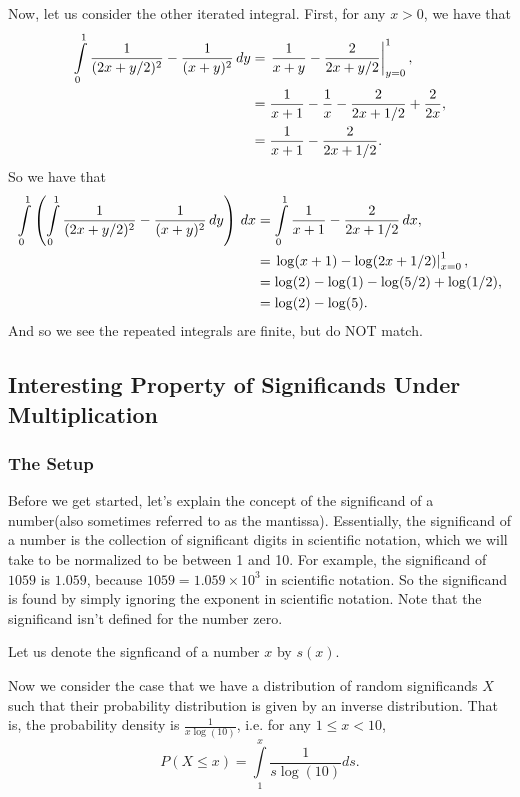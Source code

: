 Now, let us consider the other iterated integral. First, for any \(x > 0\), we have that
\begin{align}
\int\limits_0^1 \frac{1}{(2x + y/2)^2} - \frac{1}{(x+y)^2} \, dy & = \left.\frac{1}{x+y} - \frac{2}{2x + y/2}\right|_{y = 0}^1, \\
    & = \frac{1}{x+1} - \frac{1}{x} -\frac{2}{2x+1/2} + \frac{2}{2x}, \\ 
    & = \frac{1}{x+1} - \frac{2}{2x+1/2}.
\end{align}
So we have that
\begin{align}
\int\limits_0^1 \left(\int\limits_0^1 \frac{1}{(2x + y/2)^2} - \frac{1}{(x+y)^2} \, dy\right) \, dx & = \int\limits_0^1 \frac{1}{x+1} - \frac{2}{2x+1/2} \, dx, \\
    & = \left. \log(x+1) - \log(2x + 1/2)\right|_{x = 0}^1, \\
    & = \log(2) - \log(1) - \log(5/2) + \log(1/2), \\
    & = \log(2) - \log(5). 
\end{align}
And so we see the repeated integrals are finite, but do NOT match.



\subsection{Interesting Property of Significands Under Multiplication}

\subsubsection*{The Setup}

Before we get started, let's explain the concept of the significand of a number(also sometimes referred to as the mantissa). Essentially, the significand of a
number is the collection of significant digits in scientific notation, which we will take to be normalized to be between 1 and 10. For example, the
significand of \(1059\) is \(1.059\), because \(1059 = 1.059 \times 10^3\) in scientific notation. So the significand is found by simply ignoring the exponent
in scientific notation. Note that the significand isn't defined for the number zero. 

Let us denote the signficand of a number \(x\) by \(s(x)\).

Now we consider the case that we have a distribution of random significands \(X\) such that their probability distribution is given by 
an inverse distribution. That is, the probability density is \(\frac{1}{x\log(10)}\), i.e. for any \(1 \leq x < 10\),
\begin{equation}
P\left(X \leq x\right) = \int \limits_1^x \frac{1}{s\log(10)} ds.
\end{equation}

